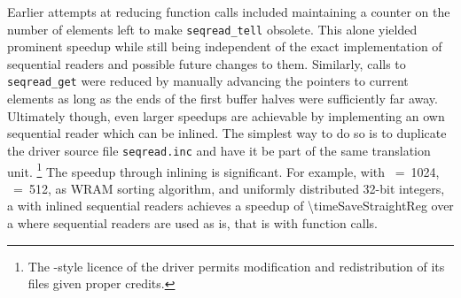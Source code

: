 Earlier attempts at reducing function calls included maintaining a counter on the number of elements left to make \lstinline|seqread_tell| obsolete.
This alone yielded prominent speedup while still being independent of the exact implementation of sequential readers and possible future changes to them.
Similarly, calls to \lstinline|seqread_get| were reduced by manually advancing the pointers to current elements as long as the ends of the first buffer halves were sufficiently far away.
Ultimately though, even larger speedups are achievable by implementing an own sequential reader which can be inlined.
The simplest way to do so is to duplicate the driver source file \lstinline|seqread.inc| and have it be part of the same translation unit.%
\footnote{
	The -style licence of the driver permits modification and redistribution of its files given proper credits.
}
The speedup through inlining is significant.
For example, with \cachesize{}~=~1024, \seqreadcachesize{}~=~512, \QS{} as \ac{WRAM} sorting algorithm, and  uniformly distributed 32-bit integers, a \MS{} with inlined sequential readers achieves a speedup of \num[round-mode=places, round-precision=1]{\timeSaveStraightReg} over a \MS{} where sequential readers are used as is, that is with function calls.

